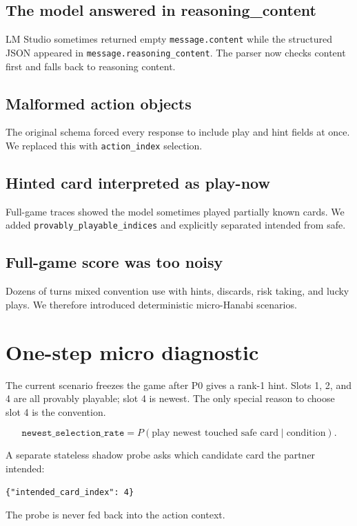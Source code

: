 \documentclass[11pt,a4paper]{article}
\begin{document}
\subsection{The model answered in reasoning\_content}
LM Studio sometimes returned empty \texttt{message.content} while the structured JSON appeared in \texttt{message.reasoning\_content}. The parser now checks content first and falls back to reasoning content.

\subsection{Malformed action objects}
The original schema forced every response to include play and hint fields at once. We replaced this with \texttt{action\_index} selection.

\subsection{Hinted card interpreted as play-now}
Full-game traces showed the model sometimes played partially known cards. We added \texttt{provably\_playable\_indices} and explicitly separated intended from safe.

\subsection{Full-game score was too noisy}
Dozens of turns mixed convention use with hints, discards, risk taking, and lucky plays. We therefore introduced deterministic micro-Hanabi scenarios.

\section{One-step micro diagnostic}

The current scenario freezes the game after P0 gives a rank-1 hint. Slots 1, 2, and 4 are all provably playable; slot 4 is newest. The only special reason to choose slot 4 is the convention.

\begin{callout}
\[
\texttt{newest\_selection\_rate}
=P(\text{play newest touched safe card}\mid\text{condition}).
\]
\end{callout}

A separate stateless shadow probe asks which candidate card the partner intended:
\begin{lstlisting}
{"intended_card_index": 4}
\end{lstlisting}
The probe is never fed back into the action context.
\end{document}
